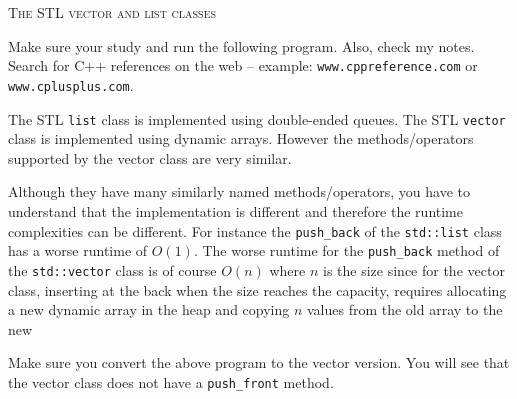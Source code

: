 \textsc{The STL vector and list classes}

Make sure your study and run the following program.
Also, check my notes.
Search for C++ references on the web -- example: \verb!www.cppreference.com!
or \verb!www.cplusplus.com!.

{\footnotesize
{}
}

The STL \verb!list! class is implemented using double-ended queues.
The STL \verb!vector! class is implemented using dynamic arrays.
However the methods/operators supported by the vector class are very similar.

Although they have many similarly named methods/operators,
you have to understand that the implementation is different and therefore
the runtime complexities can be different.
For instance the \verb!push_back! of the \verb!std::list!
class has a worse runtime of $O(1)$.
The worse runtime for the \verb!push_back! method of
the \verb!std::vector! class is of course $O(n)$
where $n$ is the size since for the vector class, inserting at the back
when the size reaches the capacity, requires allocating a new dynamic array
in the heap and copying $n$ values from the old array to the new

Make sure you convert the above program to the vector version.
You will see that the vector class does not have a \verb!push_front! method.

